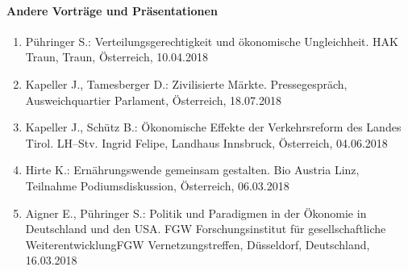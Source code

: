 \paragraph{Andere Vorträge und Präsentationen}
\begin{enumerate}
	\item Pühringer S.: Verteilungsgerechtigkeit und ökonomische Ungleichheit. HAK Traun, Traun, Österreich, 10.04.2018
	\item Kapeller J., Tamesberger D.: Zivilisierte Märkte. Pressegespräch, Ausweichquartier Parlament, Österreich, 18.07.2018
	\item Kapeller J., Schütz B.: Ökonomische Effekte der Verkehrsreform des Landes Tirol. LH--Stv. Ingrid Felipe, Landhaus Innsbruck, Österreich, 04.06.2018
	\item Hirte K.: Ernährungswende gemeinsam gestalten. Bio Austria Linz, Teilnahme Podiumsdiskussion, Österreich, 06.03.2018
	\item Aigner E., Pühringer S.: Politik und Paradigmen in der Ökonomie in Deutschland und den USA. FGW Forschungsinstitut für gesellschaftliche WeiterentwicklungFGW Vernetzungstreffen, Düsseldorf, Deutschland, 16.03.2018
\end{enumerate}
